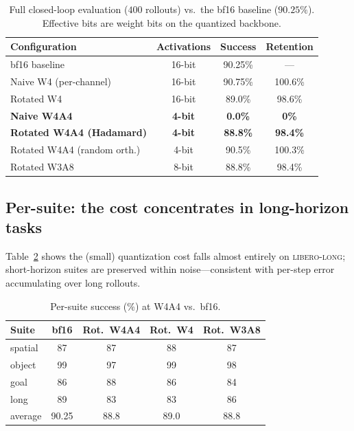\documentclass[conference]{IEEEtran}
\begin{document}
\begin{table}[h]\centering
\caption{Full closed-loop evaluation ($400$ rollouts) vs.\ the bf16 baseline ($90.25\%$).
Effective bits are weight bits on the quantized backbone.}
\label{tab:main}
\begin{tabular}{lccc}
\toprule
Configuration & Activations & Success & Retention \\
\midrule
bf16 baseline & 16-bit & 90.25\% & --- \\
\midrule
Naive W4 (per-channel) & 16-bit & 90.75\% & 100.6\% \\
Rotated W4 & 16-bit & 89.0\% & 98.6\% \\
\textbf{Naive W4A4} & \textbf{4-bit} & \textbf{0.0\%} & \textbf{0\%} \\
\textbf{Rotated W4A4 (Hadamard)} & \textbf{4-bit} & \textbf{88.8\%} & \textbf{98.4\%} \\
Rotated W4A4 (random orth.) & 4-bit & 90.5\% & 100.3\% \\
Rotated W3A8 & 8-bit & 88.8\% & 98.4\% \\
\bottomrule
\end{tabular}
\end{table}

\subsection{Per-suite: the cost concentrates in long-horizon tasks}
Table~\ref{tab:persuite} shows the (small) quantization cost falls almost entirely on
\textsc{libero-long}; short-horizon suites are preserved within noise---consistent with
per-step error accumulating over long rollouts.

\begin{table}[h]\centering
\caption{Per-suite success (\%) at W4A4 vs.\ bf16.}
\label{tab:persuite}
\begin{tabular}{lcccc}
\toprule
Suite & bf16 & Rot.\ W4A4 & Rot.\ W4 & Rot.\ W3A8 \\
\midrule
spatial & 87 & 87 & 88 & 87 \\
object  & 99 & 97 & 99 & 98 \\
goal    & 86 & 88 & 86 & 84 \\
long    & 89 & 83 & 83 & 86 \\
\midrule
average & 90.25 & 88.8 & 89.0 & 88.8 \\
\bottomrule
\end{tabular}
\end{table}
\end{document}
